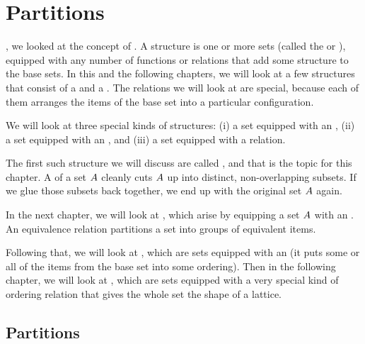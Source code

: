 \documentclass[../../../main.tex]{subfiles}
\begin{document}
\chapter{Partitions}
\label{ch:partitions}

, we looked at the concept of . A structure is one or more sets (called the  or ), equipped with any number of functions or relations that add some structure to the base sets. In this and the following chapters, we will look at a few structures that consist of a  and a . The relations we will look at are special, because each of them arranges the items of the base set into a particular configuration.

\begin{aside}
  \begin{remark}
    We will look at three special kinds of structures: (i) a set equipped with an , (ii) a set equipped with an , and (iii) a set equipped with a  relation.
  \end{remark}
\end{aside}

The first such structure we will discuss are called , and that is the topic for this chapter. A  of a set $A$ cleanly cuts $A$ up into distinct, non-overlapping subsets. If we glue those subsets back together, we end up with the original set $A$ again.

In the next chapter, we will look at , which arise by equipping a set $A$ with an . An equivalence relation partitions a set into groups of equivalent items. 

Following that, we will look at , which are sets equipped with an  (it puts some or all of the items from the base set into some ordering). Then in the following chapter, we will look at , which are sets equipped with a very special kind of ordering relation that gives the whole set the shape of a lattice.


\section{Partitions}
\end{document}
